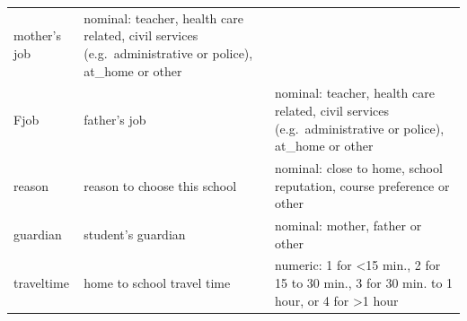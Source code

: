 \documentclass[]{article}
\begin{document}
\begin{longtable}[]{@{}lll@{}}
\begin{minipage}[t]{0.28\columnwidth}
mother's job\strut
\end{minipage} & \begin{minipage}[t]{0.58\columnwidth}\raggedright
nominal: teacher, health care related, civil services
(e.g.~administrative or police), at\_home or other\strut
\end{minipage}\tabularnewline
\begin{minipage}[t]{0.05\columnwidth}\raggedright
Fjob\strut
\end{minipage} & \begin{minipage}[t]{0.28\columnwidth}\raggedright
father's job\strut
\end{minipage} & \begin{minipage}[t]{0.58\columnwidth}\raggedright
nominal: teacher, health care related, civil services
(e.g.~administrative or police), at\_home or other\strut
\end{minipage}\tabularnewline
\begin{minipage}[t]{0.05\columnwidth}\raggedright
reason\strut
\end{minipage} & \begin{minipage}[t]{0.28\columnwidth}\raggedright
reason to choose this school\strut
\end{minipage} & \begin{minipage}[t]{0.58\columnwidth}\raggedright
nominal: close to home, school reputation, course preference or
other\strut
\end{minipage}\tabularnewline
\begin{minipage}[t]{0.05\columnwidth}\raggedright
guardian\strut
\end{minipage} & \begin{minipage}[t]{0.28\columnwidth}\raggedright
student's guardian\strut
\end{minipage} & \begin{minipage}[t]{0.58\columnwidth}\raggedright
nominal: mother, father or other\strut
\end{minipage}\tabularnewline
\begin{minipage}[t]{0.05\columnwidth}\raggedright
traveltime\strut
\end{minipage} & \begin{minipage}[t]{0.28\columnwidth}\raggedright
home to school travel time\strut
\end{minipage} & \begin{minipage}[t]{0.58\columnwidth}\raggedright
numeric: 1 for \textless{}15 min., 2 for 15 to 30 min., 3 for 30 min. to
1 hour, or 4 for \textgreater{}1 hour\strut

\end{minipage}
\end{longtable}
\end{document}
